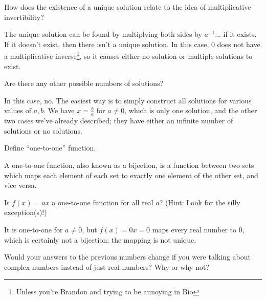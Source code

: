 \documentclass[../key.tex]{subfiles}
\begin{document}
\begin{inner_problem}
\item How does the existence of a unique solution relate to the idea of multiplicative invertibility?
\end{inner_problem}

The unique solution can be found by multiplying both sides by $a^{-1}$... if it exists. If it doesn't exist, then there isn't a unique solution. In this case, $0$ does not have a multiplicative inverse\footnote{Unless you're Brandon and trying to be annoying in Bio}, so it causes either no solution or multiple solutions to exist.

\begin{inner_problem}
\item Are there any other possible numbers of solutions?
\end{inner_problem}

In this case, no. The easiest way is to simply construct all solutions for various values of $a,b$. We have $x=\frac{b}{a}$ for $a\neq 0$, which is only one solution, and the other two cases we've already described; they have either an infinite number of solutions or no solutions.

\begin{outer_problem}
\item
\end{outer_problem}

\begin{inner_problem}[start=1]
\item Define ``one-to-one'' function.
\end{inner_problem}

A one-to-one function, also known as a bijection, is a function between two sets which maps each element of each set to exactly one element of the other set, and vice versa.

\begin{inner_problem}
\item Is $f(x)=ax$ a one-to-one function for all real $a$? (Hint: Look for the silly exception(s)!)
\end{inner_problem}

It is one-to-one for $a\neq 0$, but $f(x)=0x=0$ maps every real number to $0$, which is certainly not a bijection; the mapping is not unique.

\begin{outer_problem}
\item Would your answers to the previous numbers change if you were talking about complex numbers instead of just real numbers? Why or why not?
\end{outer_problem}
\end{document}
